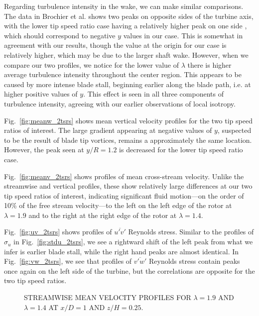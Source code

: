 Regarding turbulence intensity in the wake, we can make similar comparisons. The
data in Brochier et al. shows two peaks on opposite sides of the turbine axis,
with the lower tip speed ratio case having a relatively higher peak on one side
\cite{brochier86}, which should correspond to negative $y$ values in our case.
This is somewhat in agreement with our results, though the value at the origin
for our case is relatively higher, which may be due to the larger shaft wake.
However, when we compare our two profiles, we notice for the lower value of
$\lambda$ there is higher average turbulence intensity throughout the center
region. This appears to be caused by more intense blade stall, beginning earlier
along the blade path, i.e. at higher positive values of $y$. This effect is seen
in all three components of turbulence intensity, agreeing with our earlier
observations of local isotropy.

Fig.~\ref{fig:meanw_2tsrs} shows mean vertical velocity profiles for the two tip
speed ratios of interest. The large gradient appearing at negative values of
$y$, suspected to be the result of blade tip vortices, remains a approximately
the same location. However, the peak seen at $y/R = 1.2$ is decreased for the
lower tip speed ratio case.

Fig.~\ref{fig:meanv_2tsrs} shows profiles of mean cross-stream velocity. Unlike
the streamwise and vertical profiles, these show relatively large differences at
our two tip speed ratios of interest, indicating significant fluid motion---on
the order of 10\% of the free stream velocity---to the left on the left edge of
the rotor at $\lambda=1.9$ and to the right at the right edge of the rotor at
$\lambda = 1.4$.

Fig.~\ref{fig:uv_2tsrs} shows profiles of $\overline{u'v'}$ Reynolds stress.
Similar to the profiles of $\sigma_u$ in Fig.~\ref{fig:stdu_2tsrs}, we see a
rightward shift of the left peak from what we infer is earlier blade stall,
while the right hand peaks are almost identical. In Fig.~\ref{fig:vw_2tsrs}, we
see that profiles of $\overline{v'w'}$ Reynolds stress contain peaks once again
on the left side of the turbine, but the correlations are opposite for the two
tip speed ratios.

\begin{figure}[t]

    \caption{STREAMWISE MEAN VELOCITY PROFILES FOR $\lambda = 1.9$ AND
        $\lambda=1.4$ AT $x/D=1$ AND $z/H = 0.25$.}

    \label{fig:meanu_2tsrs} 
\end{figure}

